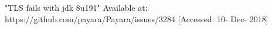  "TLS fails with jdk 8u191" Available at: https://github.com/payara/Payara/issues/3284 [Accessed: 10- Dec- 2018]